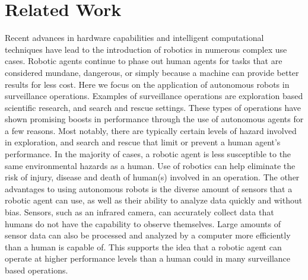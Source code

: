 

\chapter{Related Work}
Recent advances in hardware capabilities and intelligent computational techniques have lead to the introduction of robotics in numerous complex use cases.
Robotic agents continue to phase out human agents for tasks that are considered mundane, dangerous, or simply because a machine can provide better results for less cost.
Here we focus on the application of autonomous robots in surveillance operations.
Examples of surveillance operations are exploration based scientific research, and search and rescue settings.
These types of operations have shown promising boosts in performance through the use of autonomous agents for a few reasons.
Most notably, there are typically certain levels of hazard involved in exploration, and search and rescue that limit or prevent a human agent's performance.
In the majority of cases, a robotic agent is less susceptible to the same environmental hazards as a human.
Use of robotics can help eliminate the risk of injury, disease and death of human(s) involved in an operation.
The other advantages to using autonomous robots is the diverse amount of sensors that a robotic agent can use, as well as their ability to analyze data quickly and without bias.
Sensors, such as an infrared camera, can accurately collect data that humans do not have the capability to observe themselves.
Large amounts of sensor data can also be processed and analyzed by a computer more efficiently than a human is capable of.
This supports the idea that a robotic agent can operate at higher performance levels than a human could in many surveillance based operations.


